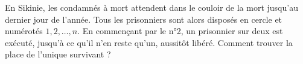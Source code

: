 En Sikinie, les condamnés à mort attendent dans le couloir de la mort jusqu'au dernier jour de l'année. Tous les prisonniers sont alors disposés en cercle et numérotés $1, 2, \ldots, n$. En commençant par le n°2, un prisonnier sur deux est exécuté, jusqu'à ce qu'il n'en reste qu'un, aussitôt libéré. Comment trouver la place de l'unique survivant ?
